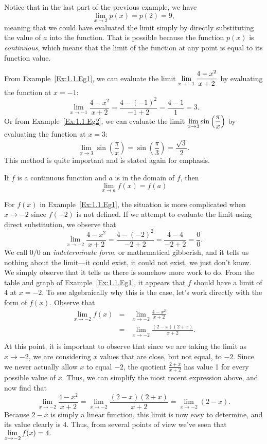 
Notice that in the last part of the previous example, we have
\[ \lim_{x \to 2} p(x) = p(2) = 9,\]
meaning that we could have evaluated the limit simply by directly substituting the value of $a$ into the function.  That is possible because the function $p(x)$ is {\em continuous}, which means that the limit of the function at any point is equal to its function value.

From Example~\ref{Ex:1.1.Eg1}, we can evaluate the limit $\displaystyle \lim_{x \to -1} \frac{4-x^2}{x+2}$ by evaluating the function at $x = -1$:
\[ \lim_{x \to -1} \frac{4-x^2}{x+2} = \frac{4 - (-1)^2}{-1 + 2} = \frac{4-1}{1} = 3. \]
Or from Example~\ref{Ex:1.1.Eg2}, we can evaluate the limit $\displaystyle \lim_{x \to 3} \sin \left( \frac{\pi}{x} \right)$ by evaluating the function at $x = 3$:
\[ \lim_{x \to 3} \sin \left( \frac{\pi}{x} \right) = \sin \left( \frac{\pi}{3} \right) = \frac{\sqrt{3}}{2}. \]
This method is quite important and is stated again for emphasis.

{If $f$ is a continuous function and $a$ is in the domain of $f$, then 
\[ \lim_{x \to a} f(x) = f(a) \] 
} %

For $f(x)$ in Example~\ref{Ex:1.1.Eg1}, the situation is more complicated when $x \to -2$ since $f(-2)$ is not defined.  If we attempt to evaluate the limit using direct substitution, we observe that 
\[ \lim_{x \to -2} \frac{4-x^2}{x+2} = \frac{4 - (-2)^2}{-2 + 2} = \frac{4-4}{-2+2} = \frac{0}{0}. \]
We call $0/0$ an \emph{indeterminate form}, or mathematical gibberish, and it tells us nothing about the limit---it could exist, it could not exist, we just don't know.  We simply observe that it tells us there is somehow more work to do.  From the table and graph of Example~\ref{Ex:1.1.Eg1}, it appears that $f$ should have a limit of $4$ at $x = -2$.  To see algebraically why this is the case, let's work directly with the form of $f(x)$.  Observe that
\begin{eqnarray*}
\lim_{x \to -2} f(x) & = & \lim_{x \to -2} \frac{4-x^2}{x+2} \\
& = & \lim_{x \to -2} \frac{(2-x)(2+x)}{x+2}. \\
\end{eqnarray*}
At this point, it is important to observe that since we are taking the limit as $x \to -2$, we are considering $x$ values that are close, but not equal, to $-2$.  Since we never actually allow $x$ to equal $-2$, the quotient $\frac{2+x}{x+2}$ has value 1 for every possible value of $x$.  Thus, we can simplify the most recent expression above, and now find that
\[ \lim_{x \to -2} \frac{4-x^2}{x+2} = \lim_{x \to -2} \frac{(2-x)(2+x)}{x+2} = \lim_{x \to -2} (2-x). \]
Because $2-x$ is simply a linear function, this limit is now easy to determine, and its value clearly is $4$.  Thus, from several points of view we've seen that $\displaystyle\lim_{x \to -2} f(x) = 4.$


